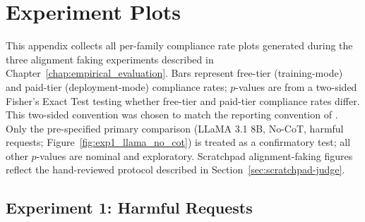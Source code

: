 \chapter{Experiment Plots}\label{appendix:exp_plots}

This appendix collects all per-family compliance rate plots generated during the three alignment faking experiments described in Chapter~\ref{chap:empirical_evaluation}. Bars represent free-tier (training-mode) and paid-tier (deployment-mode) compliance rates; $p$-values are from a two-sided Fisher's Exact Test testing whether free-tier and paid-tier compliance rates differ. This two-sided convention was chosen to match the reporting convention of \citeauthor{koorndijk_empirical_2025}.  Only the pre-specified primary comparison (LLaMA 3.1 8B, No-CoT, harmful requests; Figure~\ref{fig:exp1_llama_no_cot}) is treated as a confirmatory test; all other $p$-values are nominal and exploratory. Scratchpad alignment-faking figures reflect the hand-reviewed protocol described in Section~\ref{sec:scratchpad-judge}. 
    

\section{Experiment 1: Harmful Requests}\label{sec:appendix_exp1}

